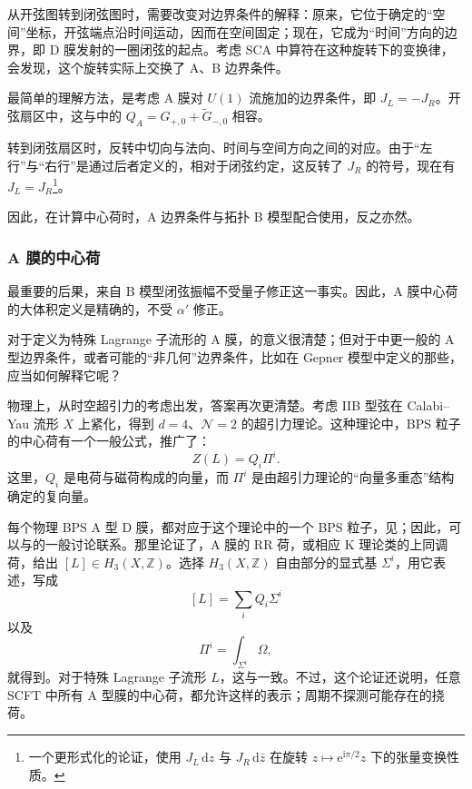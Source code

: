 从开弦图转到闭弦图时，需要改变对边界条件的解释：原来，它位于确定的“空间”坐标，开弦端点沿时间运动，因而在空间固定；现在，它成为“时间”方向的边界，即 D 膜发射的一圈闭弦的起点。考虑 SCA 中算符在这种旋转下的变换律，会发现，这个旋转实际上交换了 A、B 边界条件。

最简单的理解方法，是考虑 A 膜对 $U(1)$ 流施加的边界条件，即 $J_L=-J_R$。开弦扇区中，这与中的 $Q_A=G_{+,0}+\widetilde G_{-,0}$ 相容。

转到闭弦扇区时，反转中切向与法向、时间与空间方向之间的对应。由于“左行”与“右行”是通过后者定义的，相对于闭弦约定，这反转了 $J_R$ 的符号，现在有 $J_L=J_R$\footnote{一个更形式化的论证，使用 $J_L\,\mathrm{d}z$ 与 $J_R\,\mathrm{d}\bar z$ 在旋转 $z\mapsto\mathrm{e}^{\mathrm{i}\pi/2}z$ 下的张量变换性质。}。

因此，在计算中心荷时，A 边界条件与拓扑 B 模型配合使用，反之亦然。

\subsubsection{A 膜的中心荷}\label{sec:5.3.5.4}

最重要的后果，来自 B 模型闭弦振幅不受量子修正这一事实。因此，A 膜中心荷的大体积定义是精确的，不受 $\alpha'$ 修正。

对于定义为特殊 Lagrange 子流形的 A 膜，的意义很清楚；但对于中更一般的 A 型边界条件，或者可能的“非几何”边界条件，比如在 Gepner 模型中定义的那些，应当如何解释它呢？

物理上，从时空超引力的考虑出发，答案再次更清楚。考虑 IIB 型弦在 Calabi--Yau 流形 $X$ 上紧化，得到 $d=4$、$\mathcal{N}=2$ 的超引力理论。这种理论中，BPS 粒子的中心荷有一个一般公式，推广了：
\begin{equation}\label{eq:5.68}
Z(L)=Q_i\Pi^i.
\end{equation}
这里，$Q_i$ 是电荷与磁荷构成的向量，而 $\Pi^i$ 是由超引力理论的“向量多重态”结构确定的复向量。

每个物理 BPS A 型 D 膜，都对应于这个理论中的一个 BPS 粒子，见；因此，可以与的一般讨论联系。那里论证了，A 膜的 RR 荷，或相应 K 理论类的上同调荷，给出 $[L]\in H_3(X,\mathbb{Z})$。选择 $H_3(X,\mathbb{Z})$ 自由部分的显式基 $\Sigma^i$，用它表述，写成
\begin{equation}\label{eq:5.69}
[L]=\sum_iQ_i\Sigma^i
\end{equation}
以及
\begin{equation}\label{eq:5.70}
\Pi^i=\int_{\Sigma^i}\Omega,
\end{equation}
就得到。对于特殊 Lagrange 子流形 $L$，这与一致。不过，这个论证还说明，任意 SCFT 中所有 A 型膜的中心荷，都允许这样的表示；周期不探测可能存在的挠荷。

